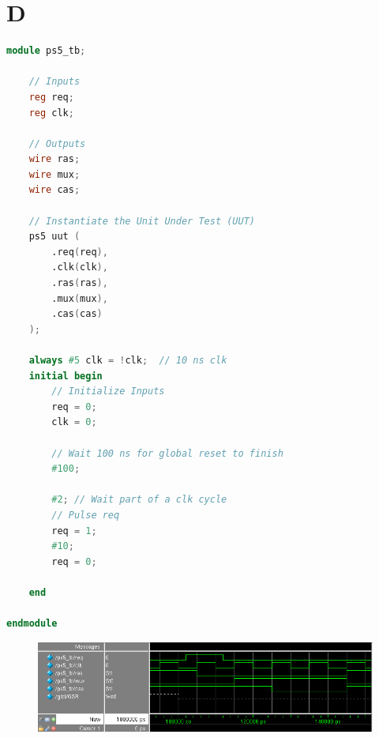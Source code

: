 \documentclass[11pt,letterpaper]{article}
\begin{document}
\section{D}
\begin{lstlisting}[language=Verilog]
module ps5_tb;

	// Inputs
	reg req;
	reg clk;

	// Outputs
	wire ras;
	wire mux;
	wire cas;

	// Instantiate the Unit Under Test (UUT)
	ps5 uut (
		.req(req), 
		.clk(clk), 
		.ras(ras), 
		.mux(mux), 
		.cas(cas)
	);

	always #5 clk = !clk;  // 10 ns clk
	initial begin
		// Initialize Inputs
		req = 0;
		clk = 0;

		// Wait 100 ns for global reset to finish
		#100;
		
		#2; // Wait part of a clk cycle
		// Pulse req
		req = 1;
		#10;
		req = 0;

	end
      
endmodule
\end{lstlisting}
\begin{figure}[H]
\includegraphics[width=6.5in]{wave.png}
\end{figure}
\end{document}
